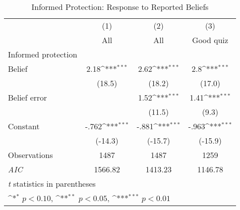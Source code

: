 \begin{table}[htbp]\centering
\def\sym#1{\ifmmode^{#1}\else\(^{#1}\)\fi}
\caption{Informed Protection: Response to Reported Beliefs}
\begin{tabular}{l*{3}{c}}
\hline\hline
                &\multicolumn{1}{c}{(1)}&\multicolumn{1}{c}{(2)}&\multicolumn{1}{c}{(3)}\\
                &\multicolumn{1}{c}{All}&\multicolumn{1}{c}{All}&\multicolumn{1}{c}{Good quiz}\\
\hline
Informed protection&                  &                  &                  \\
Belief          &     2.18\sym{***}&     2.62\sym{***}&      2.8\sym{***}\\
                &   (18.5)         &   (18.2)         &   (17.0)         \\
Belief error    &                  &     1.52\sym{***}&     1.41\sym{***}\\
                &                  &   (11.5)         &    (9.3)         \\
Constant        &    -.762\sym{***}&    -.881\sym{***}&    -.963\sym{***}\\
                &  (-14.3)         &  (-15.7)         &  (-15.9)         \\
\hline
Observations    &     1487         &     1487         &     1259         \\
\textit{AIC}    &  1566.82         &  1413.23         &  1146.78         \\
\hline\hline
\multicolumn{4}{l}{\footnotesize \textit{t} statistics in parentheses}\\
\multicolumn{4}{l}{\footnotesize \sym{*} \(p<0.10\), \sym{**} \(p<0.05\), \sym{***} \(p<0.01\)}\\
\end{tabular}
\end{table}
